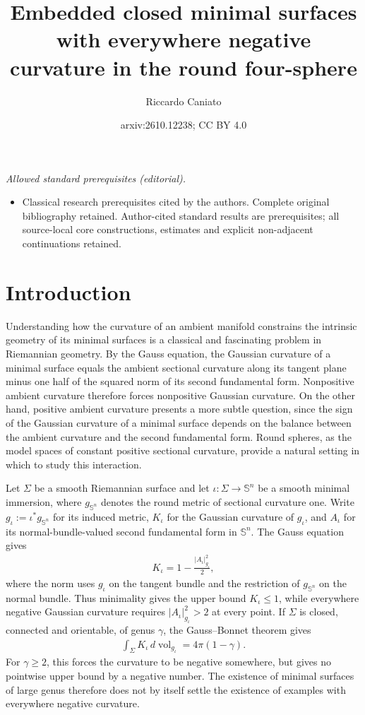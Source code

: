 \documentclass[a4paper,11pt,oneside,reqno]{amsart}
\title{Embedded closed minimal surfaces with everywhere negative curvature in the round four-sphere}
\author{Riccardo Caniato}
\date{arxiv:2610.12238; CC BY 4.0}
\numberwithin{equation}{section}
\theoremstyle{definition}
\begin{document}
\maketitle
\noindent\textit{Allowed standard prerequisites (editorial).}\begin{itemize}
\item Classical research prerequisites cited by the authors. Complete original bibliography retained. Author-cited standard results are prerequisites; all source-local core constructions, estimates and explicit non-adjacent continuations retained.
\end{itemize}\medskip
\section{Introduction}
\label{sec:s4-introduction}
%
Understanding how the curvature of an ambient manifold constrains the intrinsic geometry of its minimal surfaces is a classical and fascinating problem in Riemannian geometry. By the Gauss equation, the Gaussian curvature of a minimal surface equals the ambient sectional curvature along its tangent plane minus one half of the squared norm of its second fundamental form. Nonpositive ambient curvature therefore forces nonpositive Gaussian curvature. On the other hand, positive ambient curvature presents a more subtle question, since the sign of the Gaussian curvature of a minimal surface depends on the balance between the ambient curvature and the second fundamental form. Round spheres, as the model spaces of constant positive sectional curvature, provide a natural setting in which to study this interaction.

Let $\Sigma$ be a smooth Riemannian surface and let $\iota:\Sigma\to\mathbb{S}^n$ be a smooth
minimal immersion, where $g_{\mathbb{S}^n}$ denotes the round
metric of sectional curvature one. Write
$g_\iota:=\iota^*g_{\mathbb{S}^n}$ for its induced metric,
$K_\iota$ for the Gaussian curvature of $g_\iota$, and
$A_\iota$ for its normal-bundle-valued second fundamental
form in $\mathbb{S}^n$. The Gauss equation gives
%
\begin{align*}
    K_\iota=1-\frac{|A_\iota|_{g_\iota}^2}{2},
\end{align*}
%
where the norm uses $g_\iota$ on the tangent bundle and the
restriction of $g_{\mathbb{S}^n}$ on the normal bundle.
Thus minimality gives the upper bound $K_\iota\leq1$,
while everywhere negative Gaussian curvature requires
$|A_\iota|_{g_\iota}^2>2$ at every point.
If $\Sigma$ is closed, connected and orientable, of genus
$\gamma$, the Gauss--Bonnet theorem gives
%
\begin{align*}
    \int_\Sigma K_\iota\,d\operatorname{vol}_{g_\iota}
    =4\pi(1-\gamma).
\end{align*}
%
For $\gamma\geq2$, this forces the curvature to be negative
somewhere, but gives no pointwise upper bound by a negative
number. The existence of minimal surfaces of large genus
therefore does not by itself settle the existence of examples
with everywhere negative curvature.
\end{document}
